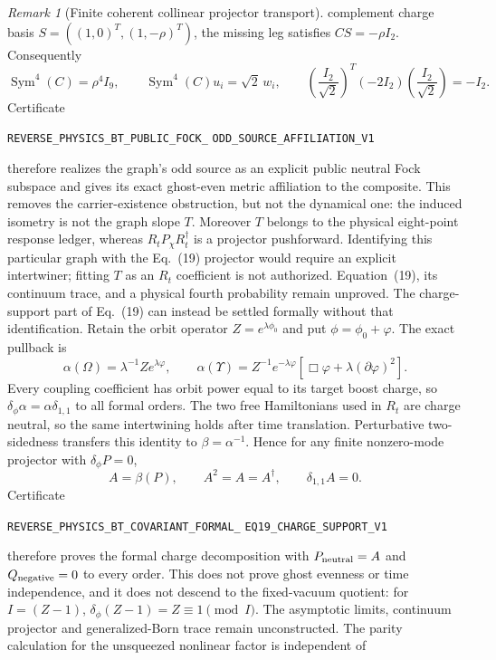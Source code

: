 \documentclass[11pt]{article}
\theoremstyle{definition}
\theoremstyle{remark}
\newtheorem{remark}[theorem]{Remark}
\begin{document}
\begin{remark}[Finite coherent collinear projector transport]
complement charge basis
$S=((1,0)^T,(1,-\rho)^T)$, the missing leg satisfies $CS=-\rho I_2$.
Consequently
\[
 \operatorname{Sym}^4(C)=\rho^4I_9,\qquad
 \operatorname{Sym}^4(C)u_i=\sqrt2\,w_i,\qquad
 \left(\frac{I_2}{\sqrt2}\right)^T(-2I_2)
 \left(\frac{I_2}{\sqrt2}\right)=-I_2.
\]
Certificate
\par\noindent
\texttt{REVERSE\_PHYSICS\_BT\_PUBLIC\_FOCK\_}
\allowbreak\texttt{ODD\_SOURCE\_AFFILIATION\_V1}
\par\noindent
therefore realizes the graph's odd source as an explicit public neutral Fock
subspace and gives its exact ghost-even metric affiliation to the composite.
This removes the carrier-existence obstruction, but not the dynamical one:
the induced isometry is not the graph slope $T$.  Moreover $T$ belongs to the
physical eight-point response ledger, whereas $R_tP_\chi R_t^\dagger$ is a
projector pushforward.  Identifying this particular graph with the
Eq.~(19) projector would require an explicit intertwiner; fitting $T$ as an
$R_t$ coefficient is not authorized.  Equation~(19), its continuum trace,
and a physical fourth probability remain unproved.
The charge-support part of Eq.~(19) can instead be settled formally without
that identification.  Retain the orbit operator
$Z=e^{\lambda\phi_0}$ and put $\phi=\phi_0+\varphi$.  The exact pullback is
\[
 \alpha(\Omega)=\lambda^{-1}Ze^{\lambda\varphi},\qquad
 \alpha(\Upsilon)=Z^{-1}e^{-\lambda\varphi}
 [\Box\varphi+\lambda(\partial\varphi)^2].
\]
Every coupling coefficient has orbit power equal to its target boost charge,
so $\delta_\phi\alpha=\alpha\delta_{1,1}$ to all formal orders.
The two free Hamiltonians used in $R_t$ are charge neutral, so the same
intertwining holds after time translation.
Perturbative two-sidedness transfers this identity to
$\beta=\alpha^{-1}$.  Hence for any finite nonzero-mode projector with
$\delta_\phi P=0$,
\[
 A=\beta(P),\qquad A^2=A=A^\dagger,\qquad
 \delta_{1,1}A=0.
\]
Certificate
\par\noindent
\texttt{REVERSE\_PHYSICS\_BT\_COVARIANT\_FORMAL\_}
\allowbreak\texttt{EQ19\_CHARGE\_SUPPORT\_V1}
\par\noindent
therefore proves the formal charge decomposition with
$P_{\rm neutral}=A$ and $Q_{\rm negative}=0$ to every order.  This does not
prove ghost evenness or time independence, and it does not descend to the
fixed-vacuum quotient: for $I=(Z-1)$,
$\delta_\phi(Z-1)=Z\equiv1\pmod I$.  The asymptotic limits, continuum
projector and generalized-Born trace remain unconstructed.
The parity calculation for the unsqueezed nonlinear factor is independent of

\end{remark}
\end{document}
